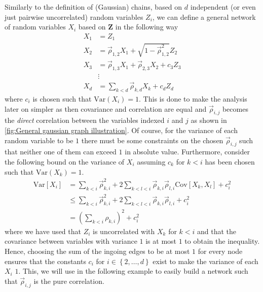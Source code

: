 \documentclass[../Thesis.tex]{subfiles}
\begin{document}
Similarly to the definition of (Gaussian) chains, based on $d$ independent (or even just pairwise uncorrelated) random variables $Z_i$, we can define a general network of random variables $X_i$ based on $\boldsymbol Z$ in the following way
\begin{equation}\label{eq:Gaussian network in terms of Z}
    \begin{split}
        X_1 & = Z_1                                                      \\
        X_2 & = \vec{\rho}_{1,2} X_1 + \sqrt{1 - \vec{\rho}_{1,2}^2} Z_2 \\
        X_3 & = \vec{\rho}_{1,3} X_1 + \vec{\rho}_{2,3} X_2 + c_3 Z_3    \\
            & \vdots                                                     \\
        X_d & = \sum_{k < d} \vec{\rho}_{k,d} X_k + c_d Z_d
    \end{split}
\end{equation}
where $c_i$ is chosen such that $\text{Var}\left(X_i\right) = 1$. This is done to make the analysis later on simpler as then covariance and correlation are equal and $\vec{\rho}_{i,j}$ becomes the \textit{direct} correlation between the variables indexed $i$ and $j$ as shown in \autoref{fig:General gaussian graph illustration}. Of course, for the variance of each random variable to be $1$ there must be some constraints on the chosen $\vec{\rho}_{i,j}$ such that neither one of them can exceed $1$ in absolute value. Furthermore, consider the following bound on the variance of $X_i$ assuming $c_k$ for $k < i$ has been chosen such that $\text{Var}\left(X_k\right) = 1$.
\begin{equation}\label{eq:bound on variance for network variable from the sum of ingoing weights}
    \begin{aligned}
        \text{Var}\left[X_i\right] & = \sum_{k < i} \vec{\rho}_{k,i}^2 + 2\sum_{k < l < i} \vec{\rho}_{k,i} \vec{\rho}_{l,i} \text{Cov} \left[X_k,X_l\right] + c_i^2 \\
                                   & \leq  \sum_{k < i} \vec{\rho}_{k,i}^2 + 2\sum_{k < l < i} \vec{\rho}_{k,i} \vec{\rho}_{l,i} + c_i^2                             \\
                                   & = \left(\sum_{k < i} \rho_{k,i}\right)^2 + c_i^2
    \end{aligned}
\end{equation}
where we have used that $Z_i$ is uncorrelated with $X_k$ for $k < i$ and that the covariance between variables with variance $1$ is at most $1$ to obtain the inequality. Hence, choosing the sum of the ingoing edges to be at most $1$ for every node ensures that the constants $c_i$ for $i\in\left\{2,\dots, d\right\}$ exist to make the variance of each $X_i$ $1$. This, we will use in the following example to easily build a network such that $\vec{\rho}_{i,j}$ is the pure correlation.
\end{document}
